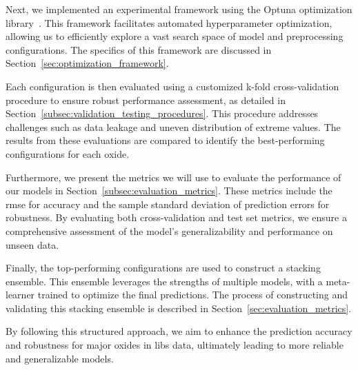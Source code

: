 Next, we implemented an experimental framework using the Optuna optimization library~\cite{optuna_2019}.
This framework facilitates automated hyperparameter optimization, allowing us to efficiently explore a vast search space of model and preprocessing configurations.
The specifics of this framework are discussed in Section~\ref{sec:optimization_framework}.

Each configuration is then evaluated using a customized k-fold cross-validation procedure to ensure robust performance assessment, as detailed in Section~\ref{subsec:validation_testing_procedures}.
This procedure addresses challenges such as data leakage and uneven distribution of extreme values.
The results from these evaluations are compared to identify the best-performing configurations for each oxide.

Furthermore, we present the metrics we will use to evaluate the performance of our models in Section~\ref{subsec:evaluation_metrics}.
These metrics include the \gls{rmse} for accuracy and the sample standard deviation of prediction errors for robustness.
By evaluating both cross-validation and test set metrics, we ensure a comprehensive assessment of the model's generalizability and performance on unseen data.

Finally, the top-performing configurations are used to construct a stacking ensemble.
This ensemble leverages the strengths of multiple models, with a meta-learner trained to optimize the final predictions.
The process of constructing and validating this stacking ensemble is described in Section~\ref{sec:evaluation_metrics}.

By following this structured approach, we aim to enhance the prediction accuracy and robustness for major oxides in \gls{libs} data, ultimately leading to more reliable and generalizable models.





